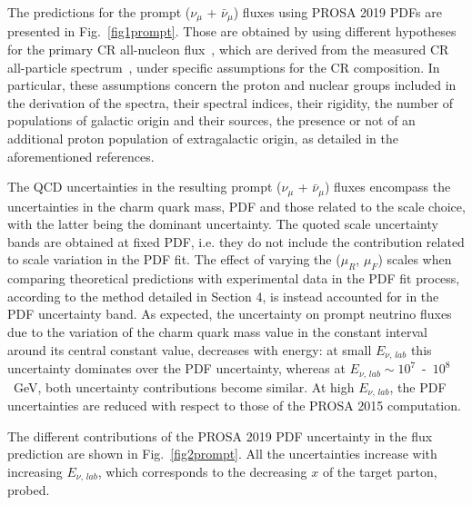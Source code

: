The predictions for the prompt ($\nu_\mu$ + $\bar{\nu}_\mu$) fluxes using PROSA 2019 PDFs are presented in Fig.~\ref{fig1prompt}. Those are obtained by using different hypotheses for the primary CR all-nucleon flux~\cite{Gaisser:2011cc,Gaisser:2013bla}, which are derived from the measured CR all-particle spectrum~\cite{Kachelriess:2019oqu}, under specific assumptions for the CR composition. In particular, these assumptions concern the proton and nuclear groups included in the derivation of the spectra, their spectral indices, their rigidity, the number of populations of galactic origin and their sources, the presence or not of an additional proton population of extragalactic origin, as detailed in the aforementioned references.   

The QCD uncertainties in the resulting prompt ($\nu_\mu$ + $\bar{\nu}_\mu$) fluxes encompass the uncertainties in the charm quark mass, PDF and those related to the scale choice, with the latter being the dominant uncertainty. The quoted scale uncertainty bands are obtained at fixed PDF, i.e. they do not include the contribution related to scale variation in the PDF fit. The effect of varying the ($\mu_R$, $\mu_F$) scales when comparing theoretical predictions with experimental data in the PDF fit process, according to the method detailed in Section 4, is instead accounted for in the PDF uncertainty band.  
As expected, the uncertainty on prompt neutrino fluxes due to the variation of the charm quark mass value in the constant interval around its central constant value, decreases with energy: at small $E_{\nu,\,lab}$ this uncertainty dominates over the PDF uncertainty, whereas at $E_{\nu,\,lab} \sim 10^7$~-~$10^8$~GeV, both uncertainty contributions become similar. 
At high $E_{\nu,\,lab}$, the PDF uncertainties are reduced with respect to those of the PROSA 2015 computation. 

The different contributions of the PROSA 2019 PDF uncertainty in the flux prediction are shown in Fig.~\ref{fig2prompt}. All the uncertainties increase with increasing $E_{\nu,\,lab}$, which corresponds to the decreasing $x$ of the target parton, probed. 

